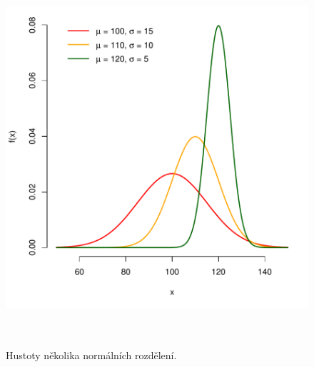 \begin{figure}[p]\centering
      \includegraphics[width=140mm, height=140mm]{../img/ukazka-obr02}
      \caption{Hustoty několika normálních rozdělení.}
      \label{obr03:Nhust}
\end{figure}

